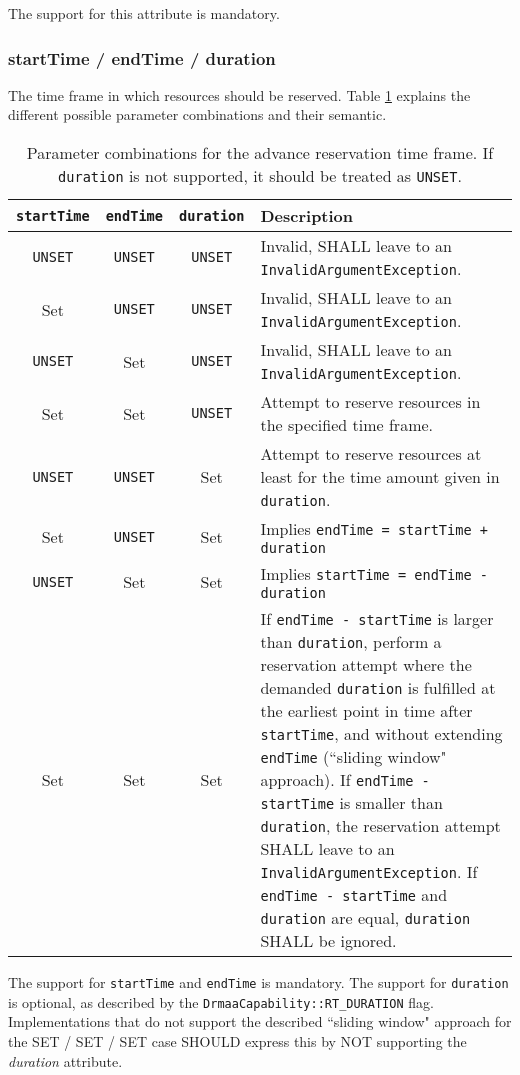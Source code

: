 \documentclass{article}
\newcommand{\h}[1]{\lstinline|#1|}
\begin{document}
The support for this attribute is mandatory.

\subsubsection{startTime / endTime / duration}

The time frame in which resources should be reserved. Table \ref{tab:reservation} explains the different possible parameter combinations and their semantic.

\begin{table}[ht]
\centering
\begin{tabularx}{\textwidth}{|c|c|c|X|}
\hline
\h{startTime} & \h{endTime} & \h{duration} & Description\\
\hline
\h{UNSET} & \h{UNSET} & \h{UNSET} & Invalid, SHALL leave to an \h{InvalidArgumentException}.  \\
Set & \h{UNSET} & \h{UNSET} & Invalid, SHALL leave to an \h{InvalidArgumentException}.  \\
\h{UNSET} & Set & \h{UNSET} & Invalid, SHALL leave to an \h{InvalidArgumentException}.  \\
Set & Set & \h{UNSET} & Attempt to reserve resources in the specified time frame. \\
\h{UNSET} & \h{UNSET} & Set & Attempt to reserve resources at least for the time amount given in \h{duration}. \\
Set & \h{UNSET} & Set & Implies \h{endTime = startTime + duration} \\
\h{UNSET} & Set & Set & Implies \h{startTime = endTime - duration} \\
Set & Set & Set & If \h{endTime - startTime} is larger than \h{duration}, perform a reservation attempt where the demanded \h{duration} is fulfilled at the earliest point in time after \h{startTime}, and without extending \h{endTime} (``sliding window" approach). If \h{endTime - startTime} is smaller than \h{duration}, the reservation attempt SHALL leave to an \h{InvalidArgumentException}.  If \h{endTime - startTime} and \h{duration} are equal, \h{duration} SHALL be ignored. \\
\hline
\end{tabularx}
\caption{Parameter combinations for the advance reservation time frame. If \h{duration} is not supported, it should be treated as \h{UNSET}.}
\label{tab:reservation}
\end{table}

The support for \h{startTime} and \h{endTime} is mandatory. The support for \h{duration} is optional, as described by the \h{DrmaaCapability::RT_DURATION} flag. Implementations that do not support the described ``sliding window" approach for the SET / SET / SET case SHOULD express this by NOT supporting the \emph{duration} attribute.
\end{document}
